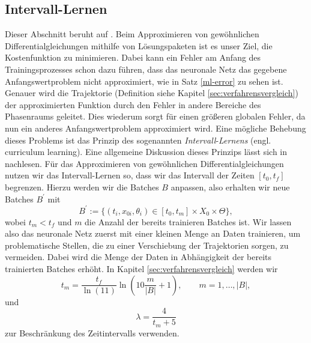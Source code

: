 \subsection{Intervall-Lernen}
\label{subsec:curriculum-learning}
Dieser Abschnitt beruht auf \cite{flamantPersonlicheKommunikation2022}.
Beim Approximieren von gewöhnlichen Differentialgleichungen mithilfe von Lösungspaketen ist es unser Ziel, die
Kostenfunktion zu minimieren. Dabei kann ein Fehler am Anfang des Trainingsprozesses schon dazu
führen, dass das neuronale Netz das gegebene Anfangswertproblem nicht approximiert, wie in Satz \ref{ml-error} zu sehen
ist. Genauer wird die Trajektorie (Definition siehe Kapitel \ref{sec:verfahrensvergleich}) der approximierten Funktion
durch den Fehler in andere Bereiche des Phasenraums geleitet. Dies wiederum sorgt für einen größeren globalen Fehler, da
nun ein anderes Anfangswertproblem approximiert wird. Eine mögliche Behebung dieses Problems ist das Prinzip des
sogenannten \textit{Intervall}-\textit{Lernens} (engl. curriculum learning). Eine allgemeine Diskussion dieses Prinzips
lässt sich in \cite{bengioCurriculumLearning2009} nachlesen. Für das Approximieren von gewöhnlichen
Differentialgleichungen nutzen wir das Intervall-Lernen so, dass wir das Intervall der Zeiten $[t_0, t_f]$ begrenzen.
Hierzu werden wir die Batches $B$ anpassen, also erhalten wir neue Batches $B^{\prime}$ mit
\[
    B^{\prime}:=  \{(t_i,x_{0i},\theta_i) \in [t_0,t_m] \times X_0 \times \Theta\},
\]
wobei $t_m<t_f$ und $m$ die Anzahl der bereits trainieren Batches ist. Wir lassen also das neuronale Netz zuerst mit
einer kleinen Menge an Daten trainieren, um problematische Stellen, die zu einer Verschiebung der Trajektorien sorgen,
zu vermeiden. Dabei wird die Menge der Daten in Abhängigkeit der bereits trainierten Batches erhöht. In Kapitel
\ref{sec:verfahrensvergleich} werden wir
\[
    t_m = \frac{t_f}{\ln(11)} \ln\left(10 \frac{m}{|B|} + 1 \right), \qquad m = 1, \dots, |B|,
\]
und
\[
    \lambda = \frac{4}{t_m + 5}
\]
zur Beschränkung des Zeitintervalls verwenden.

